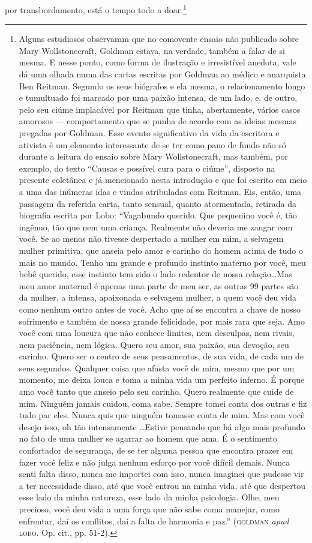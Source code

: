 por transbordamento, está o tempo todo a doar.\footnote{Alguns
  estudiosos observaram que no comovente ensaio não publicado sobre Mary
  Wollstonecraft, Goldman estava, na verdade, também a falar de si
  mesma. E nesse ponto, como forma de ilustração e irresistível anedota,
  vale dá uma olhada numa das cartas escritas por Goldman ao médico e
  anarquista Ben Reitman. Segundo os seus biógrafos e ela mesma, o
  relacionamento longo e tumultuado foi marcado por uma paixão intensa,
  de um lado, e, de outro, pelo seu ciúme implacável por Reitman que
  tinha, abertamente, vários casos amorosos --- comportamento que se
  punha de acordo com as ideias mesmas pregadas por Goldman. Esse evento
  significativo da vida da escritora e ativista é um elemento
  interessante de se ter como pano de fundo não só durante a leitura do
  ensaio sobre Mary Wollstonecraft, mas também, por exemplo, do texto
  ``Causas e possível cura para o ciúme'', disposto na presente
  coletânea e já mencionado nesta introdução e que foi escrito em meio a
  uma das inúmeras idas e vindas atribuladas com Reitman. Eis, então,
  uma passagem da referida carta, tanto sensual, quanto atormentada,
  retirada da biografia escrita por Lobo: ``Vagabundo querido. Que
  pequenino você é, tão ingênuo, tão que nem uma criança. Realmente não
  deveria me zangar com você. Se ao menos não tivesse despertado a
  mulher em mim, a selvagem mulher primitiva, que anseia pelo amor e
  carinho do homem acima de tudo o mais no mundo. Tenho um grande e
  profundo instinto materno por você, meu bebê querido, esse instinto
  tem sido o lado redentor de nossa relação\ldots Mas meu amor maternal é
  apenas uma parte de meu ser, as outras 99 partes são da mulher, a
  intensa, apaixonada e selvagem mulher, a quem você deu vida como
  nenhum outro antes de você. Acho que aí se encontra a chave de nosso
  sofrimento e também de nossa grande felicidade, por mais rara que
  seja. Amo você com uma loucura que não conhece limites, nem desculpas,
  nem rivais, nem paciência, nem lógica. Quero seu amor, sua paixão, sua
  devoção, seu carinho. Quero ser o centro de seus pensamentos, de sua
  vida, de cada um de seus segundos. Qualquer coisa que afasta você de
  mim, mesmo que por um momento, me deixa louca e toma a minha vida um
  perfeito inferno. É porque amo você tanto que anseio pelo seu carinho.
  Quero realmente que cuide de mim. Ninguém jamais cuidou, coma sabe.
  Sempre tomei conta dos outras e fiz tudo par eles. Nunca quis que
  ninguém tomasse conta de mim. Mas com você desejo isso, oh tão
  intensamente \ldots Estive pensando que há algo mais profundo no fato de
  uma mulher se agarrar ao homem que ama. É o sentimento confortador de
  segurança, de se ter alguma pessoa que encontra prazer em fazer você
  feliz e não julga nenhum esforço por você difícil demais. Nunca senti
  falta disso, nunca me importei com isso, nunca imaginei que pudesse
  vir a ter necessidade disso, até que você entrou na minha vida, até
  que despertou esse lado da minha natureza, esse lado da minha
  psicologia. Olhe, meu precioso, você deu vida a uma força que não sabe
  coma manejar, como enfrentar, daí os conflitos, daí a falta de
  harmonia e paz.'' (\textsc{goldman} \emph{apud} \textsc{lobo}. Op. cit., pp. 51-2).}

